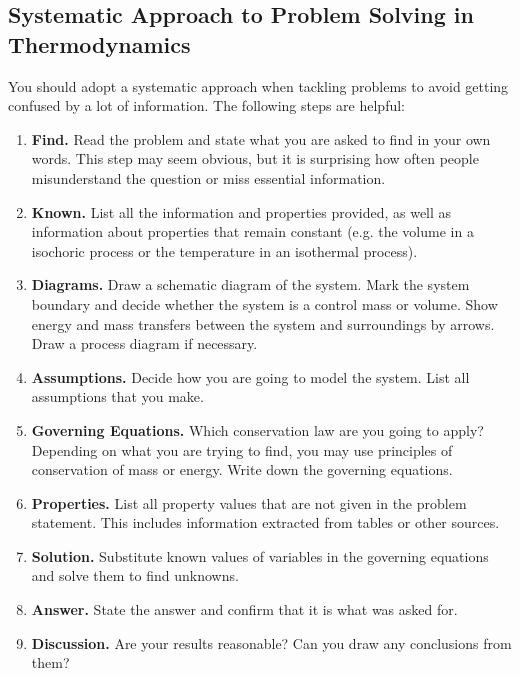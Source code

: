 \documentclass[11pt]{report}
\begin{document}
\begin{shaded}
    \section*{Systematic Approach to Problem Solving in Thermodynamics}
    You should adopt a systematic approach when tackling problems to avoid getting confused by a lot
    of information. The following steps are helpful:

    \begin{enumerate}
        \item \textbf{Find.} Read the problem and state what you are asked to find in your own words. This step
        may seem obvious, but it is surprising how often people misunderstand the question or
        miss essential information.
        \item \textbf{Known.} List all the information and properties provided, as well as information about properties that remain constant (e.g. the volume in a isochoric process or the temperature in an isothermal process).
        \item \textbf{Diagrams.} Draw a schematic diagram of the system. Mark the system boundary and decide whether the system is a control mass or volume. Show energy and mass transfers between the system and surroundings by arrows. Draw a process diagram if necessary.
        \item \textbf{Assumptions.} Decide how you are going to model the system. List all assumptions that you make.
        \item \textbf{Governing Equations.} Which conservation law are you going to apply? Depending on what you are trying to find, you may use principles of conservation of mass or energy. Write down the governing equations.
        \item \textbf{Properties.} List all property values that are not given in the problem statement. This includes information extracted from tables or other sources.
        \item \textbf{Solution.} Substitute known values of variables in the governing equations and solve them to find unknowns.
        \item \textbf{Answer.} State the answer and confirm that it is what was asked for.
        \item \textbf{Discussion.} Are your results reasonable? Can you draw any conclusions from them?
    \end{enumerate}


\end{shaded}
\end{document}
